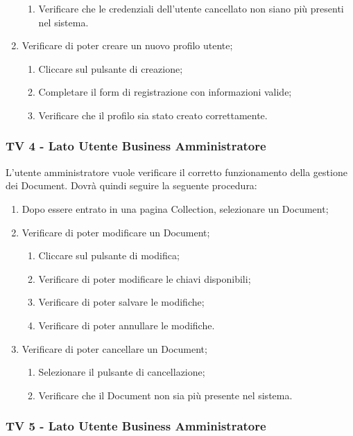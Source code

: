 \begin{enumerate}
\begin{enumerate}
\item Verificare che le credenziali dell'utente cancellato non siano più presenti nel sistema.
\end{enumerate}
\item Verificare di poter creare un nuovo profilo utente;
\begin{enumerate}
\item Cliccare sul pulsante di creazione;
\item Completare il form di registrazione con informazioni valide;
\item Verificare che il profilo sia stato creato correttamente.
\end{enumerate}
\end{enumerate}


\subsubsection{TV 4 - Lato Utente Business Amministratore}

L’utente amministratore vuole verificare il corretto funzionamento della gestione dei Document.
Dovrà quindi seguire la seguente procedura:


\begin{enumerate}
\item Dopo essere entrato in una pagina Collection, selezionare un Document;
\item Verificare di poter modificare un Document;
\begin{enumerate}
\item Cliccare sul pulsante di modifica;
\item Verificare di poter modificare le chiavi disponibili;
\item Verificare di poter salvare le modifiche;
\item Verificare di poter annullare le modifiche.
\end{enumerate}
\item Verificare di poter cancellare un Document;
\begin{enumerate}
\item Selezionare il pulsante di cancellazione;
\item Verificare che il Document non sia più presente nel sistema.
\end{enumerate}
\end{enumerate}

\subsubsection{TV 5 - Lato Utente Business Amministratore}

